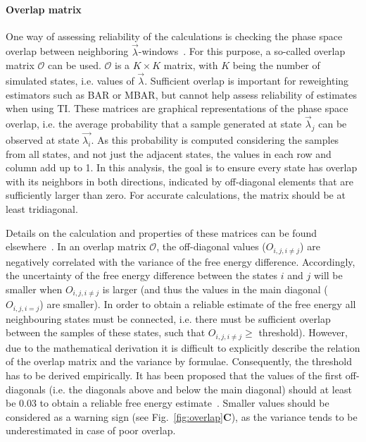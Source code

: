 \documentclass[9pt,bestpractices]{livecoms}
\begin{document}
\paragraph{Overlap matrix}
One way of assessing reliability of the calculations is checking the phase space overlap between neighboring $\vec{\lambda}$-windows~\cite{wu2005phasespace, wu2005phasespacea}. For this purpose, a so-called overlap matrix $\mathcal{O}$ can be used. $\mathcal{O}$ is a $K\times K$ matrix, with $K$ being the number of simulated states, i.e. values of $\vec{\lambda}$. Sufficient overlap is important for reweighting estimators such as BAR or MBAR, but cannot help assess reliability of estimates when using TI. 
These matrices are graphical representations of the phase space overlap, i.e. the average probability that a sample generated at state $\vec{\lambda}_{j}$ can be observed at state $\vec{\lambda_{i}}$. As this probability is computed considering the samples from all states, and not just the adjacent states, the values in each row and column add up to 1. In this analysis, the goal is to ensure every state has overlap with its neighbors in both directions, indicated by off-diagonal elements that are sufficiently larger than zero. For accurate calculations, the matrix should be at least tridiagonal.

Details on the calculation and properties of these matrices can be found elsewhere~\cite{klimovich2015guidelines}.
In an overlap matrix $\mathcal{O}$, the off-diagonal values (${O}_{i,j,i\ne j}$) are negatively correlated with the variance of the free energy difference. Accordingly, the uncertainty of the free energy difference between the states $i$ and $j$ will be smaller when ${O}_{i,j,i\ne j}$ is larger (and thus the values in the main diagonal (${O}_{i,j,i=j}$) are smaller). In order to obtain a reliable estimate of the free energy all neighbouring states must be connected, i.e. there must be sufficient overlap between the samples of these states, such that ${O}_{i,j,i\ne j}\ge$ threshold).
However, due to the mathematical derivation it is difficult to explicitly describe the relation of the overlap matrix and the variance by formulae. Consequently, the threshold has to be derived empirically. It has been proposed that the values of the first off-diagonals (i.e. the diagonals above and below the main diagonal) should at least be 0.03 to obtain a reliable free energy estimate~\cite{klimovich2015guidelines}. Smaller values should be considered as a warning sign (see Fig.~\ref{fig:overlap}\textbf{C}), as the variance tends to be underestimated in case of poor overlap.
\end{document}
